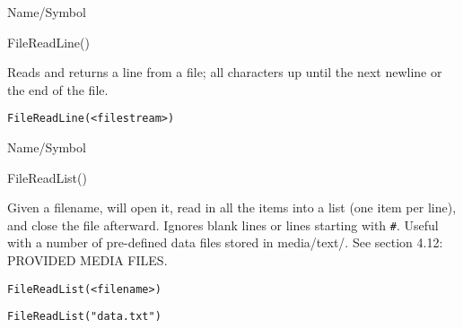 \rl




\begin{desc}{Name/Symbol}
\item[Name/Symbol]	FileReadLine()

\item[Description]	Reads and returns a line from a file; all characters up
		until the next newline or the end of the file.

\item[Usage]
\begin{verbatim}
FileReadLine(<filestream>)
\end{verbatim}

\item[Example]	

\item[See Also]	
\end{desc}

\rl




\begin{desc}{Name/Symbol}
\item[Name/Symbol]  	FileReadList()
 
\item[Description]  	Given a filename, will open it, read in all the items
	     	into a list (one item per line), and close the file
	     	afterward. Ignores blank lines or lines starting with \verb+#+.
	     	Useful with a number of pre-defined data files stored in
	     	media/text/.  See section 4.12: PROVIDED MEDIA FILES.

\item[Usage]
\begin{verbatim}
FileReadList(<filename>)
\end{verbatim}

\item[Example]
\begin{verbatim}
FileReadList("data.txt")
\end{verbatim}

\item[See Also]
\end{desc}

\rl


